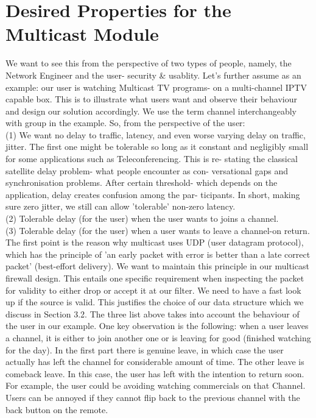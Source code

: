\documentclass[11pt,left=2cm,bottom=2cm,oneside]{book}
\begin{document}
\section{Desired Properties for the Multicast Module}
We want to see this from the perspective of two types of people, namely, the
Network Engineer and the user- security \& usablity. Let's further assume as an
example: our user is watching Multicast TV programs- on a multi-channel IPTV
capable box. This is to illustrate what users want and observe their behaviour
and
design our solution accordingly. We use the term channel interchangeably with
group in the example. So, from the perspective of the user:\\
(1) We want no delay to traffic, latency, and even worse varying delay on
traffic, jitter. The first one might be tolerable so long as it constant and
negligibly small for some applications such as Teleconferencing. This is re-
stating the classical satellite delay problem- what people encounter as con-
versational gaps and synchronisation problems. After certain threshold-
which depends on the application, delay creates confusion among the par-
ticipants. In short, making sure zero jitter, we still can allow 'tolerable'
non-zero latency.\\
(2) Tolerable delay (for the user) when the user wants to joins a channel.\\
(3) Tolerable delay (for the user) when a user wants to leave a channel-on return.
The first point is the reason why multicast uses UDP (user datagram protocol),
which has the principle of 'an early packet with error is better than a late
correct
packet' (best-effort delivery). We want to maintain this principle in our
multicast
firewall design. This entails one specific requirement when inspecting the
packet
for validity to either drop or accept it at our filter. We need to have a fast
look
up if the source is valid. This justifies the choice of our data structure
which we
discuss in Section 3.2.
The three list above takes into account the behaviour of the user in our
example.
One key observation is the following: when a user leaves a channel, it is
either to
join another one or is leaving for good (finished watching for the day). In
the first
part there is genuine leave, in which case the user actually has left the
channel for
considerable amount of time. The other leave is comeback leave. In this case,
the
user has left with the intention to return soon. For example, the user
could
be avoiding watching commercials on that Channel. Users can be annoyed if they
cannot flip back to the previous channel with the back button on the remote.
\end{document}
